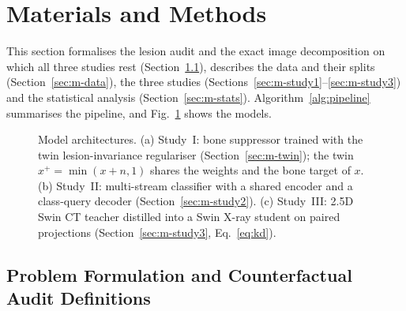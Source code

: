 \section{Materials and Methods}
\label{sec:methods}
This section formalises the lesion audit and the exact image decomposition on which all three studies rest
(Section~\ref{sec:m-formulation}), describes the data and their splits (Section~\ref{sec:m-data}), the three studies
(Sections~\ref{sec:m-study1}--\ref{sec:m-study3}) and the statistical analysis (Section~\ref{sec:m-stats}).
Algorithm~\ref{alg:pipeline} summarises the pipeline, and Fig.~\ref{fig:architecture} shows the models.

\begin{figure}[!t]
\centering
{}
\caption{Model architectures. (a) Study~I: bone suppressor trained with the twin lesion-invariance regulariser
(Section~\ref{sec:m-twin}); the twin $x^{+}=\min(x+n,1)$ shares the weights and the bone target of $x$. (b) Study~II: multi-stream
classifier with a shared encoder and a class-query decoder (Section~\ref{sec:m-study2}). (c) Study~III: 2.5D Swin CT teacher distilled
into a Swin X-ray student on paired projections (Section~\ref{sec:m-study3}, Eq.~\eqref{eq:kd}).}
\label{fig:architecture}
\end{figure}



\subsection{Problem Formulation and Counterfactual Audit Definitions}
\label{sec:m-formulation}

